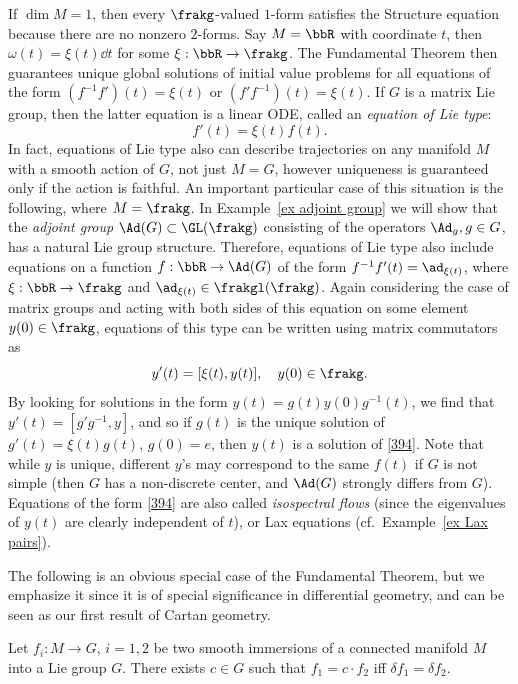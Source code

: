 \begin{example}
    If $\dim M=1$, then every $\frakg$-valued $1$-form satisfies the Structure equation because there are no nonzero $2$-forms. Say $M=\bbR$ with coordinate $t$, then $\omega(t)=\xi(t)\dd t$ for some $\xi:\bbR\to \frakg$. The Fundamental Theorem then guarantees unique global solutions of initial value problems for all equations of the form $(f^{-1}f')(t)=\xi(t)$ or $(f'f^{-1})(t)=\xi(t)$. If $G$ is a matrix Lie group, then the latter equation is a linear ODE, called an \emph{equation of Lie type}:
    \[f'(t)=\xi(t)f(t).\]
    In fact, equations of Lie type also can describe trajectories on any manifold $M$ with a smooth action of $G$, not just $M=G$, however uniqueness is guaranteed only if the action is faithful. An important particular case of this situation is the following, where $M=\frakg$. In Example~\ref{ex adjoint group} we will show that the \emph{adjoint group} $\Ad(G)\subset \GL(\frakg)$ consisting of the operators $\Ad_g,g\in G$, has a natural Lie group structure. Therefore, equations of Lie type also include equations on a function $f:\bbR\to \Ad(G)$ of the form $f^{-1}f'(t)=\ad_{\xi(t)}$, where $\xi:\bbR\to \frakg$ and $\ad_{\xi(t)}\in \frakgl(\frakg)$. Again considering the case of matrix groups and acting with both sides of this equation on some element $y(0)\in \frakg$, equations of this type can be written using matrix commutators as 
    \[y'(t)=[\xi(t),y(t)],\quad y(0)\in\frakg.\label{394}\]
    By looking for solutions in the form $y(t)=g(t)y(0)g^{-1}(t)$, we find that $y'(t)=[g'g^{-1},y]$, and so if $g(t)$ is the unique solution of $g'(t)=\xi(t)g(t)$, $g(0)=e$, then $y(t)$ is a solution of \eqref{394}. Note that while $y$ is unique, different $y$'s may correspond to the same $f(t)$ if $G$ is not simple (then $G$ has a non-discrete center, and $\Ad(G)$ strongly differs from $G$). Equations of the form \eqref{394} are also called \emph{isospectral flows} (since the eigenvalues of $y(t)$ are clearly independent of $t$), or Lax equations (cf.\ Example~\ref{ex Lax pairs}).
\end{example}

The following is an obvious special case of the Fundamental Theorem, but we emphasize it since it is of special significance in differential geometry, and can be seen as our first result of Cartan geometry.

\begin{cor}\label{cor immersions into G}
    Let $f_i:M\to G$, $i=1,2$ be two smooth immersions of a connected manifold $M$ into a Lie group $G$. There exists $c\in G$ such that $f_1=c\cdot f_2$ iff $\delta f_1=\delta f_2$.
\end{cor}





